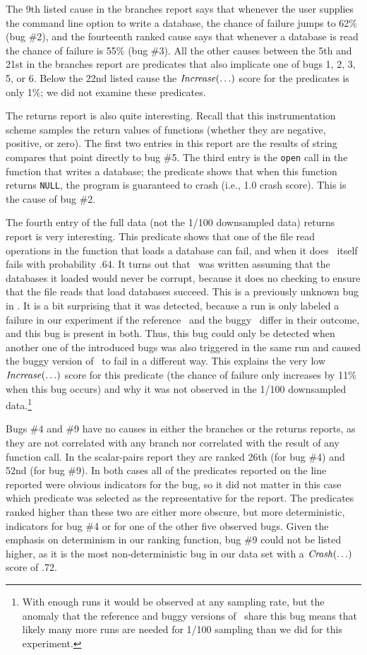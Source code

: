 The 9th listed cause in the branches report says that whenever the
user supplies the command line option to write a database, the chance
of failure jumps to 62\% (bug \#2), and the fourteenth ranked cause
says that whenever a database is read the chance of failure is 55\%
(bug \#3).  All the other causes between the 5th and 21st in the branches report are predicates that also implicate one of bugs 1, 2, 3, 5, or 6.  Below
the 22nd listed cause the $\mbox{\textit{Increase}}(\ldots)$ score for the predicates is
only 1\%; we did not examine these predicates.

The returns report is also quite interesting.  Recall that this
instrumentation scheme samples the return values of functions (whether
they are negative, positive, or zero).  The first two entries in this
report are the results of string compares that point directly to bug
\#5.  The third entry is the {\tt open} call in the function that writes
a database; the predicate shows that when this function returns {\tt NULL},
the program is guaranteed to crash (i.e., 1.0 crash score).  This is the
cause of bug \#2.

The fourth entry of the full data (not the 1/100 downsampled data)
returns report is very interesting.  This predicate shows that one of
the file read operations in the function that loads a database can
fail, and when it does \moss\ itself fails with probability .64.
It turns out that \moss\ was written assuming that the databases it
loaded would never be corrupt, because it does no checking to ensure
that the file reads that load databases succeed.  This is a previously
unknown bug in \moss.  It is a bit surprising that it was detected,
because a run is only labeled a failure in our experiment if the
reference \moss\ and the buggy \moss\ differ in their outcome, and
this bug is present in both.  Thus, this bug could only be detected
when another one of the introduced bugs was also triggered in the same
run and caused the buggy version of \moss\ to fail in a different way.
This explains the very low $\mbox{\textit{Increase}}(\ldots)$ score for this
predicate (the chance of failure only increases by 11\% when this bug
occurs) and why it was not observed in the 1/100 downsampled data.\footnote{With enough runs it would be observed at any sampling rate, but the anomaly that
the reference and buggy versions of \moss\ share this bug means that likely
many more runs are needed for 1/100 sampling than we did for this experiment.}

Bugs \#4 and \#9 have no causes in either the branches or the returns
reports, as they are not correlated with any branch nor correlated
with the result of any function call.  In the scalar-pairs report they
are ranked 26th (for bug \#4) and 52nd (for bug \#9).  In both cases
all of the predicates reported on the line reported were obvious
indicators for the bug, so it did not matter in this case which
predicate was selected as the representative for the report.  The
predicates ranked higher than these two are either more obscure,
but more deterministic, indicators for bug \#4 or for one of the other five observed bugs.
Given the emphasis on determinism in our ranking function, bug \#9 could not be listed
higher, as it is the most non-deterministic bug in our data set with a
$\mbox{\textit{Crash}}(\ldots)$ score of .72.

